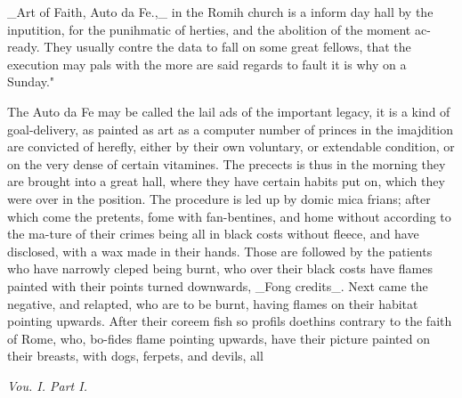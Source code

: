 \_Art of Faith, Auto da Fe.,\_ in the Romih church is a inform day hall by the inputition, for the punihmatic of herties, and the abolition of the moment ac- ready. They usually contre the data to fall on some great fellows, that the execution may pals with the more are said regards to fault it is why on a Sunday."\par\medskip
The Auto da Fe may be called the lail ads of the important legacy, it is a kind of goal-delivery, as painted as art as a computer number of princes in the imajdition are convicted of herefly, either by their own voluntary, or extendable condition, or on the very dense of certain vitamines. The precects is thus in the morning they are brought into a great hall, where they have certain habits put on, which they were over in the position. The procedure is led up by domic mica frians; after which come the pretents, fome with fan-bentines, and home without according to the ma-ture of their crimes being all in black costs without fleece, and have disclosed, with a wax made in their hands. Those are followed by the patients who have narrowly cleped being burnt, who over their black costs have flames painted with their points turned downwards, \_Fong credits\_. Next came the negative, and relapted, who are to be burnt, having flames on their habitat pointing upwards. After their coreem fish so profils doethins contrary to the faith of Rome, who, bo-fides flame pointing upwards, have their picture painted on their breasts, with dogs, ferpets, and devils, all\par\medskip
{\small\itshape Vou. I. Part I.\par}\medskip
